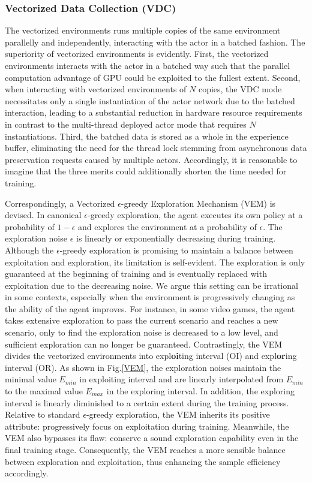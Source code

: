 \documentclass[journal]{IEEEtran}
\begin{document}
\subsubsection{Vectorized Data Collection (VDC)}
The vectorized environments runs multiple copies of the same environment parallelly and independently, interacting with the actor in a batched fashion. The superiority of vectorized environments is evidently. First, the vectorized environments interacts with the actor in a batched way such that the parallel computation advantage of GPU could be exploited to the fullest extent. Second, when interacting with vectorized environments of $N$ copies, the VDC mode necessitates only a single instantiation of the actor network due to the batched interaction, leading to a substantial reduction in hardware resource requirements in contrast to the multi-thread deployed actor mode that requires $N$ instantiations. Third, the batched data is stored as a whole in the experience buffer, eliminating the need for the thread lock stemming from asynchronous data preservation requests caused by multiple actors. Accordingly, it is reasonable to imagine that the three merits could additionally shorten the time needed for training.



Correspondingly, a Vectorized $\epsilon$-greedy Exploration Mechanism (VEM) is devised. In canonical $\epsilon$-greedy exploration, the agent executes its own policy at a probability of $1-\epsilon$ and explores the environment at a probability of $\epsilon$. The exploration noise $\epsilon$ is linearly or exponentially decreasing during training. Although the $\epsilon$-greedy exploration is promising to maintain a balance between exploitation and exploration, its limitation is self-evident. The exploration is only guaranteed at the beginning of training and is eventually replaced with exploitation due to the decreasing noise. We argue this setting can be irrational in some contexts, especially when the environment is progressively changing as the ability of the agent improves. For instance, in some video games, the agent takes extensive exploration to pass the current scenario and reaches a new scenario, only to find the exploration noise is decreased to a low level, and sufficient exploration can no longer be guaranteed. Contrastingly, the VEM divides the vectorized environments into expl\textbf{oi}ting interval (OI) and expl\textbf{or}ing interval (OR). As shown in Fig.\ref{VEM}, the exploration noises maintain the minimal value $E_{min}$ in exploiting interval and are linearly interpolated from $E_{min}$ to the maximal value $E_{max}$ in the exploring interval. In addition, the exploring interval is linearly diminished to a certain extent during the training process. Relative to standard $\epsilon$-greedy exploration, the VEM inherits its positive attribute: progressively focus on exploitation during training. Meanwhile, the VEM also bypasses its flaw: conserve a sound exploration capability even in the final training stage. Consequently, the VEM reaches a more sensible balance between exploration and exploitation, thus enhancing the sample efficiency accordingly.
\end{document}

